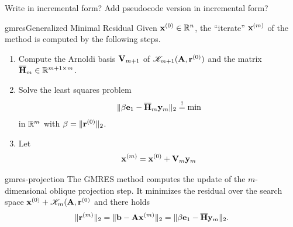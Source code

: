 \begin{todo}
  Write in incremental form? Add pseudocode version in incremental form?
\end{todo}

\begin{Algorithm*}{gmres}{Generalized Minimal Residual}
  Given $\mathbf x^{(0)}\in\mathbb R^n$, the ``iterate'' $\mathbf x^{(m)}$ of the
   method is computed by the following steps.
  \begin{enumerate}
  \item Compute the Arnoldi basis $\mathbf V_{m+1}$ of
    $\mathscr K_{m+1}(\mathbf A,\mathbf r^{(0)})$ and the matrix $\overline{\mathbf H}_m\in\mathbb R^{m+1\times m}$.
  \item Solve the least squares problem
    \begin{gather}
      \lVert\beta\mathbf e_1 - \overline{\mathbf H}_m \mathbf y_m\rVert_2 \stackrel{!}{=} \min
    \end{gather}
    in $\mathbb R^m$ with $\beta = \lVert\mathbf r^{(0)}\rVert_2$.
  \item Let
    \begin{gather}
      \mathbf x^{(m)} = \mathbf x^{(0)} + \mathbf V_{m}\mathbf y_m
    \end{gather}
  \end{enumerate}
\end{Algorithm*}

\begin{Theorem}{gmres-projection}
  The GMRES method computes the update of the $m$-dimensional oblique
  projection step. It minimizes the residual over the search space
  $\mathbf x^{(0)} +\mathscr K_m(\mathbf A,\mathbf r^{(0)}$ and there holds
  \begin{gather}
    \label{eq:gmres-norm}
    \lVert\mathbf r^{(m)}\rVert_2 = \lVert\mathbf b-\mathbf A\mathbf x^{(m)}\rVert_2 =
    \lVert\beta\mathbf e_1 - \overline{\mathbf H} \mathbf y_m\rVert_2.
  \end{gather}
\end{Theorem}

